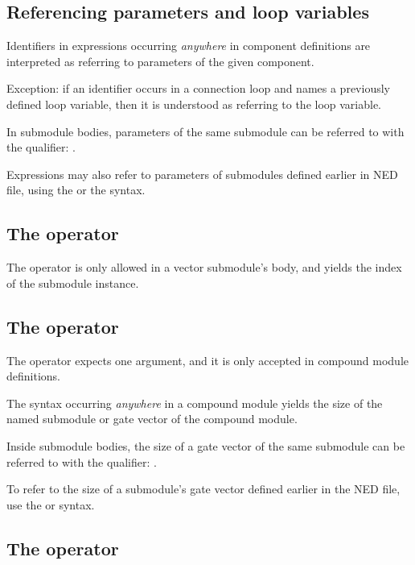 \subsection{Referencing parameters and loop variables}

Identifiers in expressions occurring \textit{anywhere} in component definitions
are interpreted as referring to parameters of the given component.

Exception: if an identifier occurs in a connection  loop and names
a previously defined loop variable, then it is understood as referring to
the loop variable.

In submodule bodies, parameters of the same submodule can be referred to
with the  qualifier: .

Expressions may also refer to parameters of submodules defined earlier
in NED file, using the  or the
 syntax.


\subsection{The  operator}

The  operator is only allowed in a vector submodule's body,
and yields the index of the submodule instance.


\subsection{The  operator}

The  operator expects one argument, and it is only accepted
in compound module definitions.

The  syntax occurring \textit{anywhere} in a compound
module yields the size of the named submodule or gate vector of the
compound module.

Inside submodule bodies, the size of a gate vector of the same submodule
can be referred to with the  qualifier: .

To refer to the size of a submodule's gate vector defined earlier in the
NED file, use the  or
 syntax.


\subsection{The  operator}

